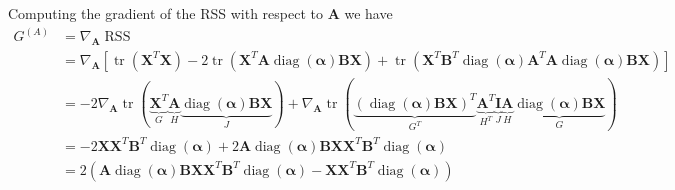 \documentclass[oneside]{article}
\begin{document}
Computing the gradient of the RSS with respect to $\mathbf{A}$ we have
\begin{equation}
    \label{eq:relaxed_objective_grad_A}
    \begin{aligned}
        G^{(A)} &= \nabla_{\mathbf{A}} \operatorname{RSS} \\
        &=\nabla_{\mathbf{A}}
        \left[
            \operatorname{tr}\left( \mathbf{X}^T \mathbf{X} \right)
            - 2 \operatorname{tr} \left( \mathbf{{X}}^T \mathbf{{A}} \operatorname{diag}(\boldsymbol{\alpha}) \mathbf{B} \mathbf{X} \right)
            + \operatorname{tr} \left( \mathbf{X}^T \mathbf{B}^T \operatorname{diag}(\boldsymbol{\alpha}) \mathbf{{A}}^T \mathbf{{A}} \operatorname{diag}(\boldsymbol{\alpha}) \mathbf{B} \mathbf{X} \right)
        \right] \\
        &= - 2 \nabla_{\mathbf{A}} \operatorname{tr}(\underbrace{\mathbf{X}^T}_{G} \underbrace{\mathbf{A}}_{H} \underbrace{\operatorname{diag}(\boldsymbol{\alpha}) \mathbf{B} \mathbf{X}}_{J})
            + \nabla_{\mathbf{A}} \operatorname{tr}(\underbrace{(\operatorname{diag}(\boldsymbol{\alpha}) \mathbf{B} \mathbf{X})^T}_{G^T} \underbrace{\mathbf{A}^T}_{H^T} \underbrace{\mathbf{I}}_{J} \underbrace{\mathbf{A}}_{H} \underbrace{\operatorname{diag}(\boldsymbol{\alpha}) \mathbf{B} \mathbf{X}}_{G}) \\
        &= - 2 \mathbf{X} \mathbf{X}^T \mathbf{B}^T \operatorname{diag}(\boldsymbol{\alpha}) + 2 \mathbf{A} \operatorname{diag}(\boldsymbol{\alpha}) \mathbf{B} \mathbf{X} \mathbf{X}^T \mathbf{B}^T \operatorname{diag}(\boldsymbol{\alpha}) \\
        &= 2 \left( \mathbf{A} \operatorname{diag}(\boldsymbol{\alpha}) \mathbf{B} \mathbf{X} \mathbf{X}^T \mathbf{B}^T \operatorname{diag}(\boldsymbol{\alpha}) - \mathbf{X} \mathbf{X}^T \mathbf{B}^T \operatorname{diag}(\boldsymbol{\alpha}) \right) \\
    \end{aligned}
\end{equation}
\end{document}
